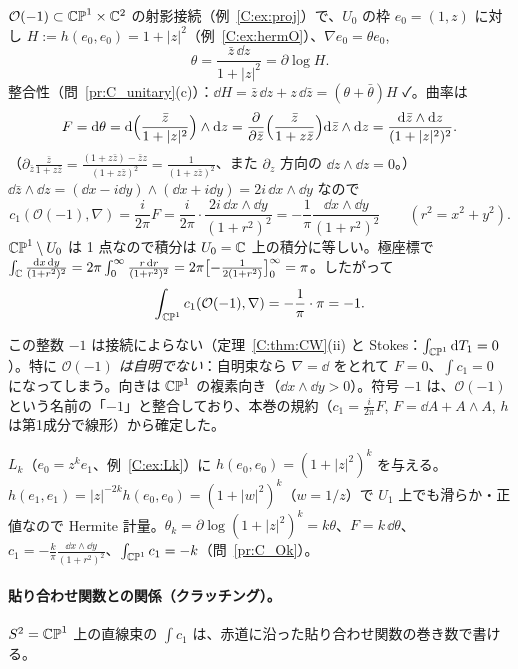 \begin{ex}[$\mathcal O(-1)\to\CP^1$：$\int c_1=-1$]\label{C:ex:taut10}
$\mathcal O(-1)\subset\mathbb{CP}^1\times\mathbb C^2$ の射影接続（例~\ref{C:ex:proj}）で、$U_0$ の枠 $e_0=(1,z)$ に対し $H:=h(e_0,e_0)=1+|z|^2$（例~\ref{C:ex:hermO}）、$\nabla e_0=\theta e_0$,
\[
\theta=\frac{\bar z\,\dd z}{1+|z|^2}=\partial\log H.
\]
整合性（問~\ref{pr:C_unitary}(c)）：$\dd H=\bar z\,\dd z+z\,\dd\bar z=(\theta+\bar\theta)H$ ✓。曲率は
\[
F=\mathrm{d}\theta=\mathrm{d}\Bigl(\frac{\bar z}{1+|z|^2}\Bigr)\wedge\mathrm{d} z=\frac{\partial}{\partial\bar z}\Bigl(\frac{\bar z}{1+z\bar z}\Bigr)\mathrm{d}\bar z\wedge\mathrm{d} z=\frac{\mathrm{d}\bar z\wedge\mathrm{d} z}{(1+|z|^2)^2}.
\]
（$\partial_{\bar z}\frac{\bar z}{1+z\bar z}=\frac{(1+z\bar z)-\bar zz}{(1+z\bar z)^2}=\frac1{(1+z\bar z)^2}$、また $\partial_z$ 方向の $\dd z\wedge\dd z=0$。）$\dd\bar z\wedge\dd z=(\dd x-i\dd y)\wedge(\dd x+i\dd y)=2i\,\dd x\wedge\dd y$ なので
\[
c_1(\mathcal O(-1),\nabla)=\frac i{2\pi}F=\frac i{2\pi}\cdot\frac{2i\,\dd x\wedge\dd y}{(1+r^2)^2}=-\frac1\pi\frac{\dd x\wedge\dd y}{(1+r^2)^2}\qquad(r^2=x^2+y^2).
\]
$\mathbb{CP}^1\setminus U_0$ は 1 点なので積分は $U_0=\mathbb C$ 上の積分に等しい。極座標で $\int_{\mathbb C}\frac{\mathrm{d} x\,\mathrm{d} y}{(1+r^2)^2}=2\pi\int_0^\infty\frac{r\,\mathrm{d} r}{(1+r^2)^2}=2\pi\bigl[-\tfrac1{2(1+r^2)}\bigr]_0^\infty=\pi$。したがって
\[
\int_{\mathbb{CP}^1}c_1(\mathcal O(-1),\nabla)=-\frac1\pi\cdot\pi=-1.
\]
\end{ex}
この整数 $-1$ は接続によらない（定理~\ref{C:thm:CW}(ii) と Stokes：$\int_{\mathbb{CP}^1}\mathrm{d} T_1=0$）。特に \emph{$\mathcal O(-1)$ は自明でない}：自明束なら $\nabla=\dd$ をとれて $F=0$、$\int c_1=0$ になってしまう。向きは $\mathbb{CP}^1$ の複素向き（$\dd x\wedge\dd y>0$）。符号 $-1$ は、$\mathcal O(-1)$ という名前の「$-1$」と整合しており、本巻の規約（$c_1=\frac i{2\pi}F$, $F=\dd A+A\wedge A$, $h$ は第1成分で線形）から確定した。

\begin{ex}[$L_k$：$\int c_1=-k$]\label{C:ex:Lk10}
$L_k$（$e_0=z^ke_1$、例~\ref{C:ex:Lk}）に $h(e_0,e_0)=(1+|z|^2)^k$ を与える。$h(e_1,e_1)=|z|^{-2k}h(e_0,e_0)=(1+|w|^2)^k$（$w=1/z$）で $U_1$ 上でも滑らか・正値なので Hermite 計量。$\theta_k=\partial\log(1+|z|^2)^k=k\theta$、$F=k\,\dd\theta$、$c_1=-\frac k\pi\frac{\dd x\wedge\dd y}{(1+r^2)^2}$、$\int_{\mathbb{CP}^1}c_1=-k$（問~\ref{pr:C_Ok}）。
\end{ex}

\paragraph{貼り合わせ関数との関係（クラッチング）。}$S^2=\mathbb{CP}^1$ 上の直線束の $\int c_1$ は、赤道に沿った貼り合わせ関数の巻き数で書ける。

